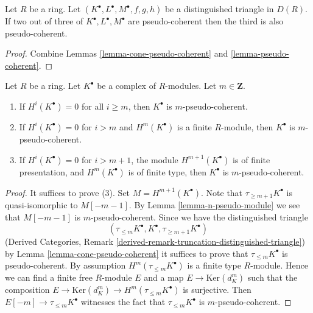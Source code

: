 \begin{lemma}
\label{lemma-two-out-of-three-pseudo-coherent}
Let $R$ be a ring. Let $(K^\bullet, L^\bullet, M^\bullet, f, g, h)$
be a distinguished triangle in $D(R)$. If two out of three of
$K^\bullet, L^\bullet, M^\bullet$ are
pseudo-coherent then the third is also pseudo-coherent.
\end{lemma}

\begin{proof}
Combine
Lemmas \ref{lemma-cone-pseudo-coherent} and \ref{lemma-pseudo-coherent}.
\end{proof}

\begin{lemma}
\label{lemma-recognize-pseudo-coherent}
Let $R$ be a ring. Let $K^\bullet$ be a complex of $R$-modules.
Let $m \in \mathbf{Z}$.
\begin{enumerate}
\item If $H^i(K^\bullet) = 0$ for all $i \geq m$, then
$K^\bullet$ is $m$-pseudo-coherent.
\item If $H^i(K^\bullet) = 0$ for $i > m$ and $H^m(K^\bullet)$ is
a finite $R$-module, then $K^\bullet$ is $m$-pseudo-coherent.
\item If $H^i(K^\bullet) = 0$ for $i > m + 1$, the module
$H^{m + 1}(K^\bullet)$ is of finite presentation, and
$H^m(K^\bullet)$ is of finite type, then $K^\bullet$ is
$m$-pseudo-coherent.
\end{enumerate}
\end{lemma}

\begin{proof}
It suffices to prove (3). Set $M = H^{m + 1}(K^\bullet)$.
Note that $\tau_{\geq m + 1}K^\bullet$ is quasi-isomorphic to
$M[- m - 1]$. By
Lemma \ref{lemma-n-pseudo-module}
we see that $M[- m - 1]$ is $m$-pseudo-coherent. Since we have
the distinguished triangle
$$
(\tau_{\leq m}K^\bullet, K^\bullet, \tau_{\geq m + 1}K^\bullet)
$$
(Derived Categories, Remark
\ref{derived-remark-truncation-distinguished-triangle}) by
Lemma \ref{lemma-cone-pseudo-coherent}
it suffices to prove that $\tau_{\leq m}K^\bullet$ is pseudo-coherent.
By assumption $H^m(\tau_{\leq m}K^\bullet)$ is a finite type $R$-module.
Hence we can find a finite free $R$-module $E$ and a map
$E \to \text{Ker}(d_K^m)$ such that the composition
$E \to \text{Ker}(d_K^m) \to H^m(\tau_{\leq m}K^\bullet)$ is surjective.
Then $E[-m] \to \tau_{\leq m}K^\bullet$ witnesses the fact
that $\tau_{\leq m}K^\bullet$ is $m$-pseudo-coherent.
\end{proof}

